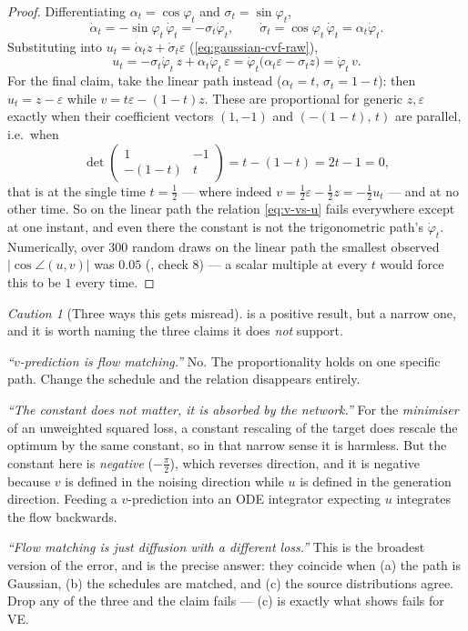 \documentclass[11pt,a4paper]{report}
\theoremstyle{definition}
\theoremstyle{remark}
\newtheorem{caution}[caution]{Caution}
\begin{document}
\begin{proof}
Differentiating $\alpha_t=\cos\varphi_t$ and $\sigma_t=\sin\varphi_t$,
\[
\dot\alpha_t = -\sin\varphi_t\,\dot\varphi_t = -\sigma_t\dot\varphi_t ,
\qquad
\dot\sigma_t = \cos\varphi_t\,\dot\varphi_t = \alpha_t\dot\varphi_t .
\]
Substituting into $u_t = \dot\alpha_tz+\dot\sigma_t\varepsilon$
(\eqref{eq:gaussian-cvf-raw}),
\[
u_t = -\sigma_t\dot\varphi_t\,z + \alpha_t\dot\varphi_t\,\varepsilon
    = \dot\varphi_t\bigl(\alpha_t\varepsilon-\sigma_tz\bigr)
    = \dot\varphi_t\,v .
\]
For the final claim, take the linear path instead ($\alpha_t=t$,
$\sigma_t=1-t$): then $u_t = z-\varepsilon$ while
$v = t\varepsilon-(1-t)z$. These are proportional for generic
$z,\varepsilon$ exactly when their coefficient vectors $(1,-1)$ and
$(-(1-t),\,t)$ are parallel, i.e.\ when
\[
\det\begin{pmatrix}1&-1\\-(1-t)&t\end{pmatrix} = t-(1-t) = 2t-1 = 0 ,
\]
that is at the single time $t=\tfrac12$ --- where indeed
$v = \tfrac12\varepsilon-\tfrac12 z = -\tfrac12u_t$ --- and at no other
time. So on the linear path the relation \eqref{eq:v-vs-u} fails everywhere
except at one instant, and even there the constant is not the trigonometric
path's $\dot\varphi_t$. Numerically, over $300$ random draws on the linear
path the smallest observed $|\cos\angle(u,v)|$ was $0.05$
(, check 8) --- a scalar multiple at every $t$ would
force this to be $1$ every time.
\end{proof}

\begin{caution}[Three ways this gets misread]
\label{caution:v-name}
 is a positive result, but a narrow one, and it is worth
naming the three claims it does \emph{not} support.

\emph{``$v$-prediction is flow matching.''} No. The proportionality holds on
one specific path. Change the schedule and the relation disappears
entirely.

\emph{``The constant does not matter, it is absorbed by the network.''} For
the \emph{minimiser} of an unweighted squared loss, a constant rescaling of
the target does rescale the optimum by the same constant, so in that narrow
sense it is harmless. But the constant here is \emph{negative}
($-\tfrac\pi2$), which reverses direction, and it is negative because $v$
is defined in the noising direction while $u$ is defined in the generation
direction. Feeding a $v$-prediction into an ODE integrator expecting $u$
integrates the flow backwards.

\emph{``Flow matching is just diffusion with a different loss.''} This is
the broadest version of the error, and  is the
precise answer: they coincide when (a) the path is Gaussian, (b) the
schedules are matched, and (c) the source distributions agree. Drop any of
the three and the claim fails --- (c) is exactly what
 shows fails for VE.
\end{caution}
\end{document}
